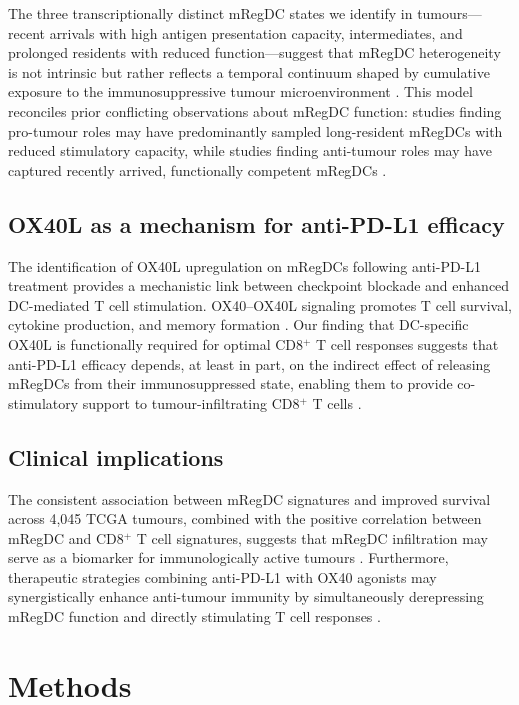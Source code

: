 \documentclass[11pt]{article}
\begin{document}
The three transcriptionally distinct mRegDC states we identify in tumours---recent arrivals with high antigen presentation capacity, intermediates, and prolonged residents with reduced function---suggest that mRegDC heterogeneity is not intrinsic but rather reflects a temporal continuum shaped by cumulative exposure to the immunosuppressive tumour microenvironment \citep{Veglia2021}. This model reconciles prior conflicting observations about mRegDC function: studies finding pro-tumour roles may have predominantly sampled long-resident mRegDCs with reduced stimulatory capacity, while studies finding anti-tumour roles may have captured recently arrived, functionally competent mRegDCs \citep{Maier2020,Cheng2021}.

\subsection{OX40L as a mechanism for anti-PD-L1 efficacy}

The identification of OX40L upregulation on mRegDCs following anti-PD-L1 treatment provides a mechanistic link between checkpoint blockade and enhanced DC-mediated T cell stimulation. OX40--OX40L signaling promotes T cell survival, cytokine production, and memory formation \citep{Croft2010,Webb2016}. Our finding that DC-specific OX40L is functionally required for optimal CD8$^{+}$ T cell responses suggests that anti-PD-L1 efficacy depends, at least in part, on the indirect effect of releasing mRegDCs from their immunosuppressed state, enabling them to provide co-stimulatory support to tumour-infiltrating CD8$^{+}$ T cells \citep{Garris2018}.

\subsection{Clinical implications}

The consistent association between mRegDC signatures and improved survival across 4,045 TCGA tumours, combined with the positive correlation between mRegDC and CD8$^{+}$ T cell signatures, suggests that mRegDC infiltration may serve as a biomarker for immunologically active tumours \citep{Galon2019}. Furthermore, therapeutic strategies combining anti-PD-L1 with OX40 agonists may synergistically enhance anti-tumour immunity by simultaneously derepressing mRegDC function and directly stimulating T cell responses \citep{Curti2013}.

\section{Methods}
\end{document}
